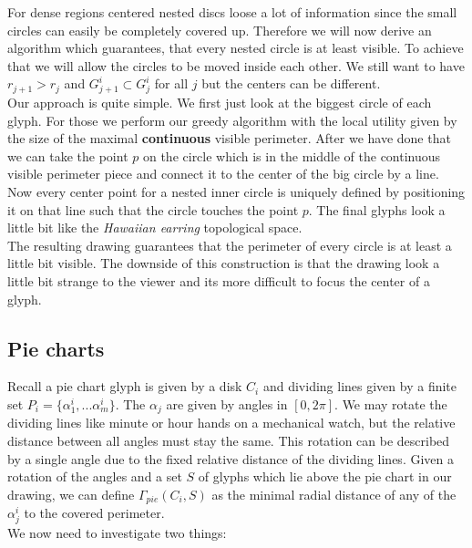 \documentclass[a4paper,11pt]{article}
\begin{document}
For dense regions centered nested discs loose a lot of information since the small circles can easily be completely covered up. Therefore we will now derive an algorithm which guarantees, that every nested circle is at least visible. To achieve that we will allow the circles to be moved inside each other. We still want to have $r_{j+1}>r_j$ and $G^i_{j+1}\subset G^i_j$ for all $j$ but the centers can be different.\\

Our approach is quite simple. We first just look at the biggest circle of each glyph. For those we perform our greedy algorithm with the local utility given by the size of the maximal \textbf{continuous} visible perimeter. After we have done that we can take the point $p$ on the circle which is in the middle of the continuous visible perimeter piece and connect it to the center of the big circle by a line. Now every center point for a nested inner circle is uniquely defined by positioning it on that line such that the circle touches the point $p$. The final glyphs look a little bit like the \textit{Hawaiian earring} topological space.\\

The resulting drawing guarantees that the perimeter of every circle is at least a little bit visible. The downside of this construction is that the drawing look a little bit strange to the viewer and its more difficult to focus the center of a glyph.



\subsection{Pie charts}

Recall a pie chart glyph is given by a disk $C_i$ and dividing lines given by a finite set $P_i= \{\alpha_1^i,...\alpha_m^i\}$. The $\alpha_j$ are given by angles in $[0,2\pi ]$. We may rotate the dividing lines like minute or hour hands on a mechanical watch, but the relative distance between all angles must stay the same. This rotation can be described by a single angle due to the fixed relative distance of the dividing lines. Given a rotation of the angles and a set $S$ of glyphs which lie above the pie chart in our drawing, we can define $\Gamma_{pie}(C_i,S)$ as the minimal radial distance of any of the $\alpha^i_j$ to the covered perimeter. \\

We now need to investigate two things:
\end{document}
